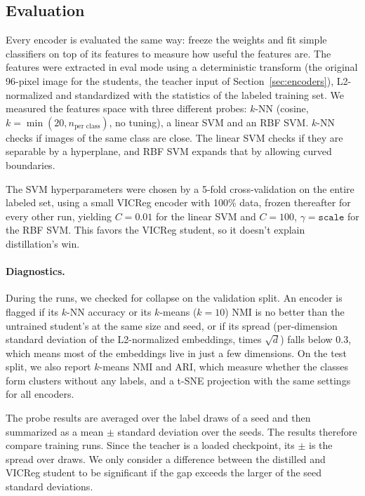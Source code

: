 \documentclass[letterpaper,11pt]{article}
\begin{document}
\subsection{Evaluation}
\label{sec:eval}

Every encoder is evaluated the same way: freeze the weights and fit simple classifiers on top of its features to measure how useful the features are. The features were extracted in eval mode using a deterministic transform (the original 96-pixel image for the students, the teacher input of Section~\ref{sec:encoders}), L2-normalized and standardized with the statistics of the labeled training set. We measured the features space with three different probes: $k$-NN (cosine, $k=\min(20, n_{\text{per class}})$, no tuning), a linear SVM and an RBF SVM. $k$-NN checks if images of the same class are close. The linear SVM checks if they are separable by a hyperplane, and RBF SVM expands that by allowing curved boundaries.

The SVM hyperparameters were chosen by a 5-fold cross-validation on the entire labeled set, using a small VICReg encoder with 100\% data, frozen thereafter for every other run, yielding $C=0.01$ for the linear SVM and $C=100$, $\gamma=\texttt{scale}$ for the RBF SVM. This favors the VICReg student, so it doesn't explain distillation's win. 

\paragraph{Diagnostics.} During the runs, we checked for collapse on the validation split. An encoder is flagged if its $k$-NN accuracy or its $k$-means ($k=10$) NMI is no better than the untrained student's at the same size and seed, or if its spread (per-dimension standard deviation of the L2-normalized embeddings, times $\sqrt d$) falls below 0.3, which means most of the embeddings live in just a few dimensions. On the test split, we also report $k$-means NMI and ARI, which measure whether the classes form clusters without any labels, and a t-SNE projection with the same settings for all encoders. 

The probe results are averaged over the label draws of a seed and then summarized as a mean $\pm$ standard deviation over the seeds. The results therefore compare training runs. Since the teacher is a loaded checkpoint, its $\pm$ is the spread over draws. We only consider a difference between the distilled and VICReg student to be significant if the gap exceeds the larger of the seed standard deviations.
\end{document}
